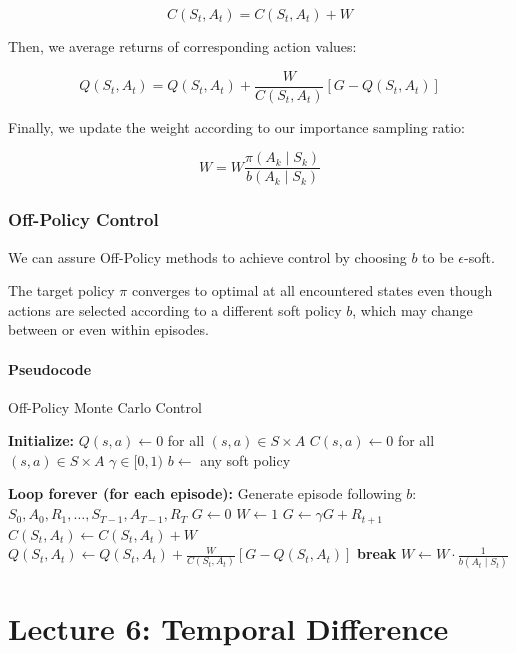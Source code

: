 \documentclass[
  letterpaper,
  DIV=11,
  numbers=noendperiod]{scrreprt}
\begin{document}
\[
C(S_{t},A_{t}) = C(S_{t},A_{t}) + W
\]

Then, we average returns of corresponding action values:

\[
Q(S_{t},A_{t}) = Q(S_{t},A_{t}) + \frac{W}{C(S_{t},A_{t})}[G - Q(S_{t},A_{t})]
\]

Finally, we update the weight according to our importance sampling
ratio:

\[
W = W \frac{\pi(A_{k} \mid S_{k})}{b(A_{k} \mid S_{k})}
\]

\section{Off-Policy Control}\label{off-policy-control}

We can assure Off-Policy methods to achieve control by choosing \(b\) to
be \(\epsilon\)-soft.

The target policy \(\pi\) converges to optimal at all encountered states
even though actions are selected according to a different soft policy
\(b\), which may change between or even within episodes.

\subsection{Pseudocode}\label{pseudocode-8}

\begin{algorithm}[htb!]
\caption{Off-Policy Monte Carlo Control}
\begin{algorithmic}[1]
\State \textbf{Initialize:} 
\State $Q(s, a) \gets 0$ for all $(s, a) \in S \times A$
\State $C(s, a) \gets 0$ for all $(s, a) \in S \times A$
\State $\gamma \in [0, 1)$
\State $b \gets$ any soft policy

\State \textbf{Loop forever (for each episode):}
\State Generate episode following $b$: $S_{0}, A_{0}, R_{1}, \dots, S_{T-1}, A_{T-1}, R_{T}$
\State $G \gets 0$
\State $W \gets 1$
    \State $G \gets \gamma G + R_{t+1}$
    \State $C(S_{t}, A_{t}) \gets C(S_{t}, A_{t}) + W$
    \State $Q(S_{t}, A_{t}) \gets Q(S_{t}, A_{t}) + \frac{W}{C(S_{t}, A_{t})} [G - Q(S_{t}, A_{t})]$
        \State \textbf{break}
    \Endif
    \State $W \gets W \cdot \frac{1}{b(A_{t} \mid S_{t})}$
\Endfor

\end{algorithmic}
\end{algorithm}

\part{Lecture 6: Temporal Difference}
\end{document}

